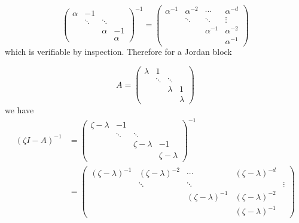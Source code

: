 \documentclass[12pt,landscape]{article}
\def\sopmatrix#1{ \begin{pmatrix}#1\end{pmatrix} }
\begin{document}
{\[
\sopmatrix{\alpha  & -1 \\
            & \ddots &\ddots \\
            &&\alpha & -1 \\ &&& \alpha}^{-1} = \sopmatrix{\alpha^{-1} & \alpha^{-2} & \cdots & \alpha^{-d} \\
                                                                    & \ddots& \ddots&\vdots \\
                                                                    & & \alpha^{-1} & \alpha^{-2} \\
                                                                    &&& \alpha^{-1}}
\]
which is verifiable by inspection. Therefore for a Jordan block

\[
A =\sopmatrix{\lambda  & 1 \\
            & \ddots &\ddots \\
            &&\lambda & 1 \\ &&& \lambda}
\]
we have
\begin{align*}
(\zeta I - A)^{-1} &=  \sopmatrix{\zeta - \lambda  & -1 \\
            & \ddots &\ddots \\
            &&\zeta - \lambda & -1 \\ &&& \zeta - \lambda}^{-1}\\
            &=\sopmatrix{(\zeta-\lambda)^{-1} & (\zeta-\lambda)^{-2} & \cdots & (\zeta-\lambda)^{-d} \\
                                                                    & \ddots& \ddots&  &\vdots \\
                                                                    & & (\zeta-\lambda)^{-1} & (\zeta-\lambda)^{-2} \\
                                                                    &&& (\zeta-\lambda)^{-1}}
\end{align*}

}
\end{document}
